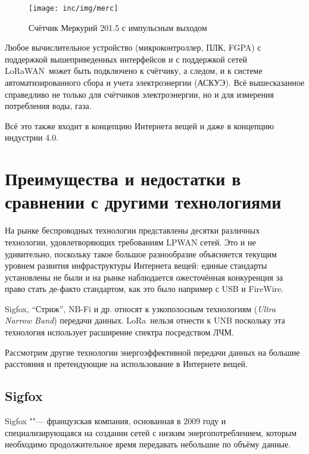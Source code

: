 \begin{figure}[!h]
  \centering
  \texttt{[image: inc/img/merc]}
  \caption{Счётчик Меркурий 201.5 с импульсным выходом}
  \label{fig:mercury}
\end{figure}

Любое вычислительное устройство (микроконтроллер, ПЛК, FGPA) с поддержкой 
вышеприведенных интерфейсов и с поддержкой сетей LoRaWAN\texttrademark~может 
быть подключено к 
счётчику, а следом, и к системе автоматизированного сбора и учета 
электроэнергии (АСКУЭ).
Всё вышесказанное справедливо не только для счётчиков электроэнергии, но и для 
измерения потребления воды, газа.

Всё это также входит в концепцию Интернета вещей и даже в концепцию 
индустрии 4.0.



\section{Преимущества и недостатки в сравнении с другими технологиями}

На рынке беспроводных технологии представлены десятки различных технологии, 
удовлетворяющих требованиям LPWAN сетей.
Это и не удивительно, поскольку такое большое разнообразие объясняется текущим 
уровнем развития инфраструктуры Интернета вещей: единые стандарты установлены 
не 
были и на рынке наблюдается ожесточённая конкуренция за право стать де-факто 
стандартом, как это было например с USB и FireWire.

Sigfox, ``Стриж'', NB-Fi и др. относят к узкополосным технологиям 
(\textit{Ultra Narrow Band}) передачи данных. 
LoRa\texttrademark~нельзя отнести к UNB поскольку эта технология использует 
расширение спектра посредством ЛЧМ.

Рассмотрим другие технологии энергоэффективной передачи данных на большие 
расстояния и претендующие на использование в Интернете вещей.

\subsection{Sigfox}

Sigfox ""--- французская компания, основанная в 2009 году и специализирующаяся 
на создании сетей с низким энергопотреблением, которым необходимо 
продолжительное время передавать небольшие по объёму данные.

